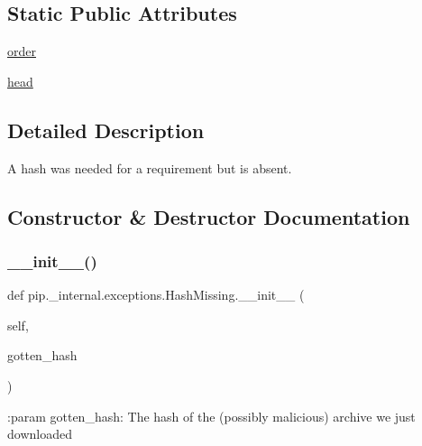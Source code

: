 \subsection*{Static Public Attributes}
\begin{DoxyCompactItemize}
\item 
\hyperlink{classpip_1_1__internal_1_1exceptions_1_1HashMissing_aa7fc90dfc984c50a21f80272a247191f}{order}
\item 
\hyperlink{classpip_1_1__internal_1_1exceptions_1_1HashMissing_a3c35601bd29c1e11ff350fe0ba6852b4}{head}
\end{DoxyCompactItemize}


\subsection{Detailed Description}
\begin{DoxyVerb}A hash was needed for a requirement but is absent.\end{DoxyVerb}
 

\subsection{Constructor \& Destructor Documentation}
\mbox{\label{classpip_1_1__internal_1_1exceptions_1_1HashMissing_a0ee6dcf494bd4022600aabde35ddd29f}} 
\subsubsection{\texorpdfstring{\+\_\+\+\_\+init\+\_\+\+\_\+()}{\_\_init\_\_()}}
{\footnotesize\ttfamily def pip.\+\_\+internal.\+exceptions.\+Hash\+Missing.\+\_\+\+\_\+init\+\_\+\+\_\+ (\begin{DoxyParamCaption}\item[{}]{self,  }\item[{}]{gotten\+\_\+hash }\end{DoxyParamCaption})}

\begin{DoxyVerb}:param gotten_hash: The hash of the (possibly malicious) archive we
    just downloaded
\end{DoxyVerb}
 

